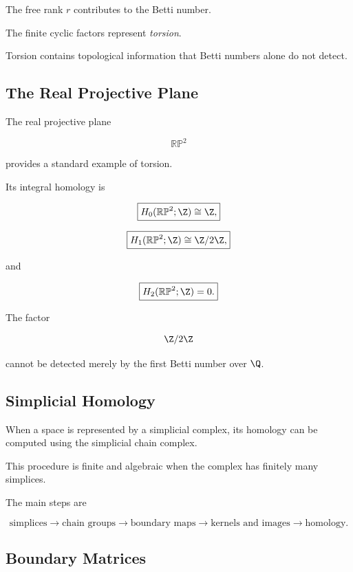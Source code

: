The free rank \(r\) contributes to the Betti number.

The finite cyclic factors represent \emph{torsion}.

Torsion contains topological information that Betti numbers alone do not
detect.

\subsection{The Real Projective Plane}
\label{subsec:homology-real-projective-plane}

The real projective plane

\[
\mathbb{RP}^2
\]

provides a standard example of torsion.

Its integral homology is

\[
\boxed{
H_0(\mathbb{RP}^2;\Z)\cong\Z,
}
\]

\[
\boxed{
H_1(\mathbb{RP}^2;\Z)
\cong
\Z/2\Z,
}
\]

and

\[
\boxed{
H_2(\mathbb{RP}^2;\Z)=0.
}
\]

The factor

\[
\Z/2\Z
\]

cannot be detected merely by the first Betti number over \(\Q\).

\subsection{Simplicial Homology}
\label{subsec:simplicial-homology}

When a space is represented by a simplicial complex, its homology can be
computed using the simplicial chain complex.

This procedure is finite and algebraic when the complex has finitely many
simplices.

The main steps are

\[
\boxed{
\text{simplices}
\longrightarrow
\text{chain groups}
\longrightarrow
\text{boundary maps}
\longrightarrow
\text{kernels and images}
\longrightarrow
\text{homology}.
}
\]

\subsection{Boundary Matrices}
\label{subsec:boundary-matrices}

